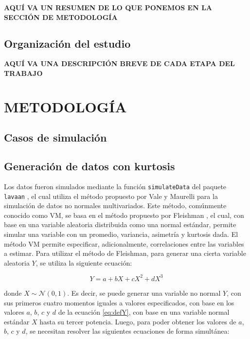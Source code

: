 \documentclass[
]{article}
\begin{document}
\textbf{AQUÍ VA UN RESUMEN DE LO QUE PONEMOS EN LA SECCIÓN DE
METODOLOGÍA}

\subsection{Organización del estudio}

\textbf{AQUÍ VA UNA DESCRIPCIÓN BREVE DE CADA ETAPA DEL TRABAJO}

\newpage

\section{METODOLOGÍA}

\subsection{Casos de simulación}

\subsection{Generación de datos con kurtosis}

Los datos fueron simulados mediante la función \texttt{simulateData} del
paquete \texttt{lavaan} \cite{lavaan}, el cual utiliza el método
propuesto por Vale y Maurelli \cite{Vale1983} para la simulación de
datos no normales multivariados. Este método, comúnmente conocido como
VM, se basa en el método propuesto por Fleishman \cite{Fleishman1978},
el cual, con base en una variable aleatoria distribuida como una normal
estándar, permite simular una variable con un promedio, variancia,
asimetría y kurtosis dada. El método VM permite especificar,
adicionalmente, correlaciones entre las variables a estimar. Para
utilizar el método de Fleishman, para generar una cierta variable
aleatoria \(Y\), se utiliza la siguiente ecuación:

\begin{equation} \label{eq:defY}
  Y = a + bX + cX^2 + d X^3
\end{equation}

donde \(X \sim \mathcal{N} (0,1)\). Es decir, se puede generar una
variable no normal \(Y\), con sus primeros cuatro momentos iguales a
valores especificados, con base en los valores \(a\), \(b\), \(c\) y
\(d\) de la ecuación \ref{eq:defY}, con base en una variable normal
estándar \(X\) hasta su tercer potencia. Luego, para poder obtener los
valores de \(a\), \(b\), \(c\) y \(d\), se necesitan resolver las
siguientes ecuaciones de forma simultánea:
\end{document}
